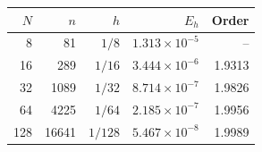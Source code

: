 \begin{tabular}{rrrrr}
\toprule
$N$ & $n$ & $h$ & $E_h$ & Order \\
\midrule
8 & 81 & $1/8$ & $1.313\times10^{-5}$ & -- \\
16 & 289 & $1/16$ & $3.444\times10^{-6}$ & 1.9313 \\
32 & 1089 & $1/32$ & $8.714\times10^{-7}$ & 1.9826 \\
64 & 4225 & $1/64$ & $2.185\times10^{-7}$ & 1.9956 \\
128 & 16641 & $1/128$ & $5.467\times10^{-8}$ & 1.9989 \\
\bottomrule
\end{tabular}
